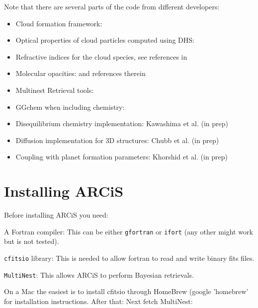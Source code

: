 \documentclass[12pt]{article}
\begin{document}
Note that there are several parts of the code from different developers:
\begin{itemize}
\item Cloud formation framework: \cite{2019A&A...622A.121O}
\item Optical properties of cloud particles computed using DHS: \cite{2005A&A...432..909M, 1981ApOpt..20.3657T}
\item Refractive indices for the cloud species, see references in \cite{2020A&A...642A..28M}
\item Molecular opacities: \cite{2021A&A...646A..21C} and references therein
\item Multinest Retrieval tools: \cite{2008MNRAS.384..449F, 2009MNRAS.398.1601F, 2019OJAp....2E..10F}
\item GGchem when including chemistry: \cite{2018A&A...614A...1W}
\item Disequilibrium chemistry implementation: Kawashima et al. (in prep)
\item Diffusion implementation for 3D structures: Chubb et al. (in prep)
\item Coupling with planet formation parameters: Khorshid et al. (in prep)
\end{itemize}

\section{Installing ARCiS}

Before installing ARCiS you need:
\begin{description}
\item{A Fortran compiler:} This can be either \texttt{gfortran} or \texttt{ifort} (any other might work but is not tested).
\item{\texttt{cfitsio} library:} This is needed to allow fortran to read and write binary fits files.
\item{\texttt{MultiNest}:} This allows ARCiS to perform Bayesian retrievals.
\end{description}

On a Mac the easiest is to install cfitsio through HomeBrew (google 'homebrew' for installation instructions. After that:
%
%
Next fetch MultiNest:
%
\vspace{-2cm}\\
\vspace{-2cm}\\
\vspace{-2cm}\\
\vspace{-2cm}\\
\end{document}
